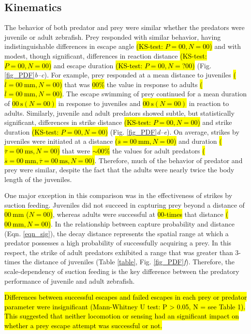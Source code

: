 \documentclass[]{rsos}%
\begin{document}
\subsection{Kinematics} %
The behavior of both predator and prey were similar whether the predators were juvenile or adult zebrafish.
Prey responded with similar behavior, having indistinguishable differences in escape angle \hl{(KS-test: $P = 00, N = 00$)} and with modest, though significant, differences in reaction distance \hl{(KS-test: $P = 00, N = 00$)} and escape duration \hl{(KS-test: $P = 00, N = ?00$)} (Fig. \ref{fig_PDF}\textit{b--c}). 
For example, prey responded at a mean distance to juveniles \hl{($\overline{l} = \SI{00}{\mm}, N = 00$)} that was \hl{00\%} the value in response to adults \hl{($\overline{l} = \SI{00}{\mm}, N = 00$)}.
The escape swimming of prey continued for a mean duration of \hl{$\SI{00}{\s} (N = 00)$} in response to juveniles and \hl{$\SI{00}{\s} (N = 00)$} in reaction to adults.
Similarly, juvenile and adult predators showed subtle, but statistically significant, differences in strike distance \hl{(KS-test: $P = 00, N = 00$)} and strike duration \hl{(KS-test: $P = 00, N = 00$)} (Fig. \ref{fig_PDF}\textit{d--e}).
On average, strikes by juveniles were initiated at a distance \hl{($\overline{s} = \SI{00}{\mm}, N = 00$)} and 
duration \hl{($\overline{\tau} = \SI{00}{\ms}, N = 00$)} that were \hl{$\sim 00\%$} the values for adult predators \hl{($\overline{s} = \SI{00}{\mm}, \overline{\tau} = \SI{00}{\ms},  N = 00$)}.
Therefore, much of the behavior of predator and prey were similar, despite the fact that the adults were nearly twice the body length of the juveniles.

One major exception in this comparison was in the effectiveness of strikes by suction feeding.
Juveniles did not succeed in capturing prey beyond a distance of \hl{$\SI{00}{\mm}$ ($N = 00$)}, whereas adults were successful at \hl{00-times} that distance \hl{($\SI{00}{\mm}, N = 00$)}.
In the relationship between capture probability and distance (Eqn. \ref{eqn_sig}), the decay distance represents the spatial range at which a predator possesses a high probability of successfully acquiring a prey. 
In this respect, the strike of adult predators exhibited a range that was greater than 3-times the distance of juveniles (Table \ref{table}, Fig. \ref{fig_PDF}\textit{f}).
Therefore, the scale-dependency of suction feeding is the key difference between the predatory performance of juvenile and adult zebrafish.

\hl{Differences between successful escapes and failed escapes in each prey or predator parameter were insignificant (Mann-Whitney U test: P > 0.05, N = see Table 1).
This suggested that neither locomotion or sensing had an significant impact on whether a prey escape attempt was successful or not.}
\end{document}
